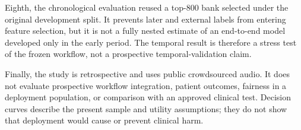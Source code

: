 Eighth, the chronological evaluation reused a top-800 bank selected under the
original development split. It prevents later and external labels from entering
feature selection, but it is not a fully nested estimate of an end-to-end model
developed only in the early period. The temporal result is therefore a stress
test of the frozen workflow, not a prospective temporal-validation claim.

Finally, the study is retrospective and uses public crowdsourced audio. It does
not evaluate prospective workflow integration, patient outcomes, fairness in a
deployment population, or comparison with an approved clinical test. Decision
curves describe the present sample and utility assumptions; they do not show
that deployment would cause or prevent clinical harm.
